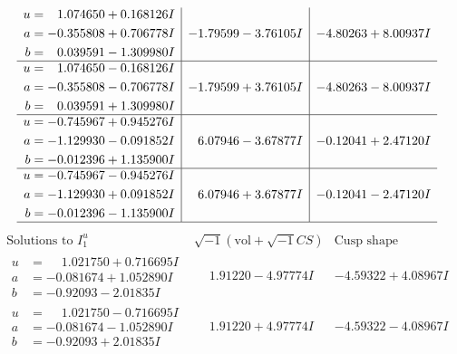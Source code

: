 \documentclass[1p]{elsarticle_modified}
\theoremstyle{definition}
\newcommand{\I}{\sqrt{-1}}
\begin{document}
$$\begin{array}{c|c|c}
\begin{aligned}
u &= \phantom{-}1.074650 + 0.168126 I \\
a &= -0.355808 + 0.706778 I \\
b &= \phantom{-}0.039591 - 1.309980 I\end{aligned}
 & -1.79599 - 3.76105 I & -4.80263 + 8.00937 I \\ \hline\begin{aligned}
u &= \phantom{-}1.074650 - 0.168126 I \\
a &= -0.355808 - 0.706778 I \\
b &= \phantom{-}0.039591 + 1.309980 I\end{aligned}
 & -1.79599 + 3.76105 I & -4.80263 - 8.00937 I \\ \hline\begin{aligned}
u &= -0.745967 + 0.945276 I \\
a &= -1.129930 - 0.091852 I \\
b &= -0.012396 + 1.135900 I\end{aligned}
 & \phantom{-}6.07946 - 3.67877 I & -0.12041 + 2.47120 I \\ \hline\begin{aligned}
u &= -0.745967 - 0.945276 I \\
a &= -1.129930 + 0.091852 I \\
b &= -0.012396 - 1.135900 I\end{aligned}
 & \phantom{-}6.07946 + 3.67877 I & -0.12041 - 2.47120 I\\
 \hline 
 \end{array}$$\newpage$$\begin{array}{c|c|c}  
\text{Solutions to }I^u_{1}& \I (\text{vol} + \sqrt{-1}CS) & \text{Cusp shape}\\
 \hline 
\begin{aligned}
u &= \phantom{-}1.021750 + 0.716695 I \\
a &= -0.081674 + 1.052890 I \\
b &= -0.92093 - 2.01835 I\end{aligned}
 & \phantom{-}1.91220 - 4.97774 I & -4.59322 + 4.08967 I \\ \hline\begin{aligned}
u &= \phantom{-}1.021750 - 0.716695 I \\
a &= -0.081674 - 1.052890 I \\
b &= -0.92093 + 2.01835 I\end{aligned}
 & \phantom{-}1.91220 + 4.97774 I & -4.59322 - 4.08967 I \\ \hline\begin{aligned}

\end{aligned}
\end{array}$$
\end{document}
